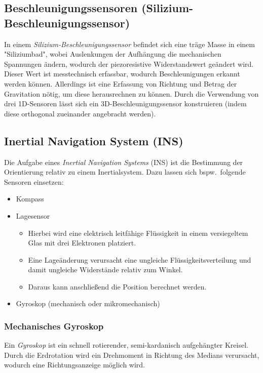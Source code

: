 \documentclass[a4paper, 11pt, accentcolor = tud3b]{tudreport}
\newcommand{\bspw}{bspw.~}
\begin{document}
			\subsection{Beschleunigungssensoren (Silizium-Beschleunigungssensor)}
				In einem \emph{Silizium-Beschleunigungssensor} befindet sich eine träge Masse in einem "Siliziumbad", wobei Auslenkungen der Aufhängung die mechanischen Spannungen ändern, wodurch der piezoresistive Widerstandswert geändert wird. Dieser Wert ist messtechnisch erfassbar, wodurch Beschleunigungen erkannt werden können. Allerdings ist eine Erfassung von Richtung und Betrag der Gravitation nötig, um diese herausrechnen zu können. Durch die Verwendung von drei 1D-Sensoren lässt sich ein 3D-Beschleunigungssensor konstruieren (indem diese orthogonal zueinander angebracht werden).

			\subsection{Inertial Navigation System (INS)} %
				Die Aufgabe eines \emph{Inertial Navigation Systems} (INS) ist die Bestimmung der Orientierung relativ zu einem Inertialsystem. Dazu lassen sich \bspw folgende Sensoren einsetzen:
				\begin{itemize}
					\item Kompass
					\item Lagesensor
						\begin{itemize}
							\item Hierbei wird eine elektrisch leitfähige Flüssigkeit in einem versiegeltem Glas mit drei Elektronen platziert.
							\item Eine Lageänderung verursacht eine ungleiche Flüssigkeitsverteilung und damit ungleiche Widerstände relativ zum Winkel.
							\item Daraus kann anschließend die Position berechnet werden.
						\end{itemize}
					\item Gyroskop (mechanisch oder mikromechanisch)
				\end{itemize}

				\subsubsection{Mechanisches Gyroskop}
					Ein \emph{Gyroskop} ist ein schnell rotierender, semi-kardanisch aufgehängter Kreisel. Durch die Erdrotation wird ein Drehmoment in Richtung des Medians verursacht, wodurch eine Richtungsanzeige möglich wird.
					
\end{document}
